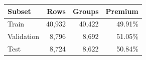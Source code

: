 \begin{tabular}{@{}lrrr@{}}
\toprule
Subset & Rows & Groups & Premium \\
\midrule
Train & 40,932 & 40,422 & 49.91\% \\
Validation & 8,796 & 8,692 & 51.05\% \\
Test & 8,724 & 8,622 & 50.84\% \\
\bottomrule
\end{tabular}
